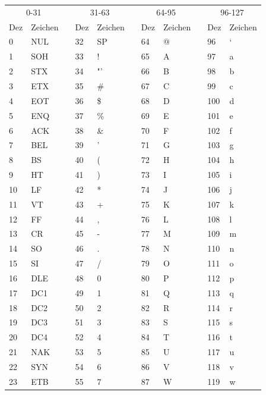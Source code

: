 \documentclass[10pt,paper=17cm:22cm, twoside=true, DIV=14]{scrbook}
\renewcommand{\arraystretch}{1.3}
\newcommand{\ra}[1]{\renewcommand{\arraystretch}{#1}}
\begin{document}
\begin{table}[!htbp]\centering
\ra{1.1}
\begin{tabular}{@{}llcllcllcll@{}}
\toprule
\multicolumn{2}{c}{0-31} & & \multicolumn{2}{c}{31-63} & &
\multicolumn{2}{c}{64-95} & & \multicolumn{2}{c}{96-127}\\
\cmidrule{1-2} \cmidrule{4-5} \cmidrule{7-8} \cmidrule{10-11}
Dez & Zeichen & & Dez  & Zeichen & & Dez & Zeichen & & Dez  & Zeichen\\
\midrule
0  & NUL & & 32 &  SP & & 64 & @ & & 96  & ` \\
1  & SOH & & 33 &  !  & & 65 & A & & 97  & a \\
2  & STX & & 34 &  "' & & 66 & B & & 98  & b \\
3  & ETX & & 35 &  \# & & 67 & C & & 99  & c \\
4  & EOT & & 36 &  \$ & & 68 & D & & 100 & d \\
5  & ENQ & & 37 &  \% & & 69 & E & & 101 & e \\
6  & ACK & & 38 &  \& & & 70 & F & & 102 & f \\
7  & BEL & & 39 &  '  & & 71 & G & & 103 & g \\
8  & BS  & & 40 &  (  & & 72 & H & & 104 & h \\
9  & HT  & & 41 &  )  & & 73 & I & & 105 & i \\
10 & LF  & & 42 &  *  & & 74 & J & & 106 & j \\
11 & VT  & & 43 &  +  & & 75 & K & & 107 & k \\
12 & FF  & & 44 &  ,  & & 76 & L & & 108 & l \\
13 & CR  & & 45 &  -  & & 77 & M & & 109 & m \\
14 & SO  & & 46 &  .  & & 78 & N & & 110 & n \\
15 & SI  & & 47 &  /  & & 79 & O & & 111 & o \\
16 & DLE & & 48 &  0  & & 80 & P & & 112 & p \\
17 & DC1 & & 49 &  1  & & 81 & Q & & 113 & q \\
18 & DC2 & & 50 &  2  & & 82 & R & & 114 & r \\
19 & DC3 & & 51 &  3  & & 83 & S & & 115 & s \\
20 & DC4 & & 52 &  4  & & 84 & T & & 116 & t \\
21 & NAK & & 53 &  5  & & 85 & U & & 117 & u \\
22 & SYN & & 54 &  6  & & 86 & V & & 118 & v \\
23 & ETB & & 55 &  7  & & 87 & W & & 119 & w \\

\end{tabular}
\end{table}
\end{document}
